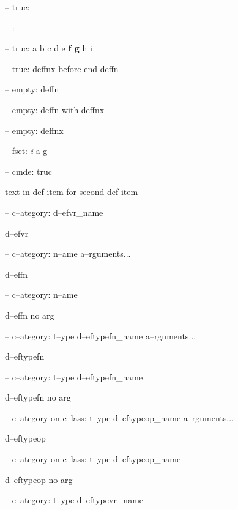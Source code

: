 \documentclass{book}
\begin{document}
%
\hbox{}-- truc: 


\hbox{}-- : 


\hbox{}-- truc: a b c d e \textbf{f g} h i


%
\hbox{}-- truc: deffnx before end deffn


%


\hbox{}-- empty: deffn


%

\hbox{}-- empty: deffn with deffnx


%
\hbox{}-- empty: deffnx


%

\hbox{}-- fset: \emph{i} a g


%
\hbox{}-- cmde: truc 


%
text in def item for second def item


\hbox{}-- c--ategory: d--efvr\_name


%
d--efvr

\hbox{}-- c--ategory: n--ame a--rguments...


%
d--effn

\hbox{}-- c--ategory: n--ame


%
d--effn no arg

\hbox{}-- c--ategory: t--ype d--eftypefn\_name a--rguments...


%
d--eftypefn

\hbox{}-- c--ategory: t--ype d--eftypefn\_name


%
d--eftypefn no arg

\hbox{}-- c--ategory on c--lass: t--ype d--eftypeop\_name a--rguments...


%
d--eftypeop

\hbox{}-- c--ategory on c--lass: t--ype d--eftypeop\_name


%
d--eftypeop no arg

\hbox{}-- c--ategory: t--ype d--eftypevr\_name
\end{document}
